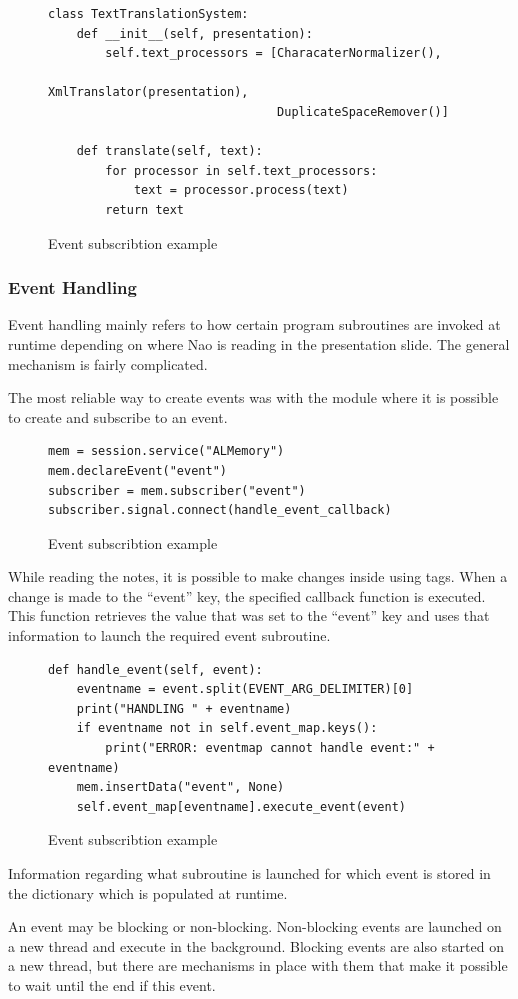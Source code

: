 \documentclass[12pt, fleqn, a4paper]{article}
\begin{document}
\begin{figure}[H]
	\centering
	\begin{verbatim}
class TextTranslationSystem:
    def __init__(self, presentation):
        self.text_processors = [CharacaterNormalizer(),
                                XmlTranslator(presentation),
                                DuplicateSpaceRemover()]

    def translate(self, text):
        for processor in self.text_processors:
            text = processor.process(text)
        return text
	\end{verbatim}
	\caption{Event subscribtion example}
\end{figure}

\subsubsection{Event Handling}
Event handling mainly refers to how certain program subroutines are invoked at runtime depending on where Nao is reading in the presentation slide. The general mechanism is fairly complicated.\par
The most reliable way to create events was with the  module where it is possible to create and subscribe to an event.
\begin{figure}[H]
	\centering
	\begin{verbatim}
mem = session.service("ALMemory")
mem.declareEvent("event")
subscriber = mem.subscriber("event")
subscriber.signal.connect(handle_event_callback)
	\end{verbatim}
	\caption{Event subscribtion example}
\end{figure}
While reading the notes, it is possible to make changes inside  using tags. When a change is made to the \enquote{event} key, the specified callback function is executed. This function retrieves the value that was set to the \enquote{event} key and uses that information to launch the required event subroutine.
\begin{figure}[H]
	\centering
	\begin{verbatim}
def handle_event(self, event):
    eventname = event.split(EVENT_ARG_DELIMITER)[0]
    print("HANDLING " + eventname)
    if eventname not in self.event_map.keys():
        print("ERROR: eventmap cannot handle event:" + eventname)
    mem.insertData("event", None)
    self.event_map[eventname].execute_event(event)
	\end{verbatim}
	\caption{Event subscribtion example}
\end{figure}
Information regarding what subroutine is launched for which event is stored in the  dictionary which is populated at runtime.\par
An event may be blocking or non-blocking. Non-blocking events are launched on a new thread and execute in the background. Blocking events are also started on a new thread, but there are mechanisms in place with them that make it possible to wait until the end if this event.
\end{document}
